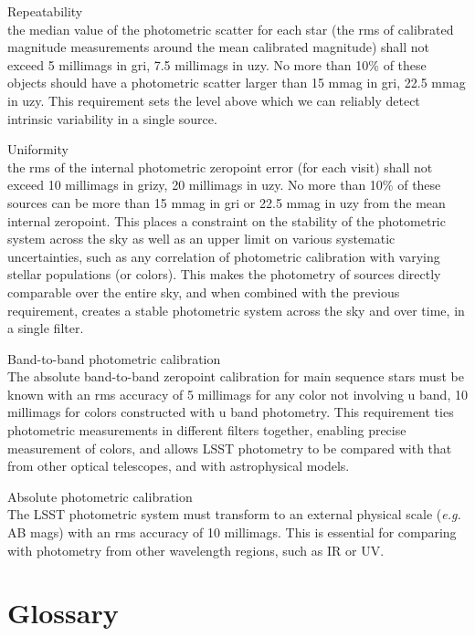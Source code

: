 \documentclass[12pt]{article}
\newcommand{\eg}{\textit{e.g.}\xspace}
\begin{document}
\begin{description}
\item{Repeatability}\\
  the median value of the photometric scatter for each star (the rms of calibrated
  magnitude measurements around the mean calibrated magnitude) shall not exceed 5 millimags in gri, 7.5
  millimags in uzy. No more than 10\% of these objects should have a photometric scatter larger than 15 mmag
  in gri, 22.5 mmag in uzy. This requirement sets the level above which we can reliably detect intrinsic
  variability in a single source.
  
\item{Uniformity}\\
  the rms of the internal photometric zeropoint error (for each visit) shall not exceed 10
  millimags in grizy, 20 millimags in uzy. No more than 10\% of these sources can be more than 15 mmag in gri
  or 22.5 mmag in uzy from the mean internal zeropoint. This places a constraint on the stability of the
  photometric system across the sky as well as an upper limit on various systematic uncertainties, such as any
  correlation of photometric calibration with varying stellar populations (or colors). This makes the
  photometry of sources directly comparable over the entire sky, and when combined with the previous
  requirement, creates a stable photometric system across the sky and over time, in a single filter.

\item{Band-to-band photometric calibration}\\
  The absolute band-to-band zeropoint calibration for main sequence
  stars must be known with an rms accuracy of 5 millimags for any color not involving u band, 10 millimags for
  colors constructed with u band photometry. This requirement ties photometric measurements in different
  filters together, enabling precise measurement of colors, and allows LSST photometry to be compared with
  that from other optical telescopes, and with astrophysical models.

\item{Absolute photometric calibration}\\
  The LSST photometric system must transform to an external physical
  scale (\eg AB mags) with an rms accuracy of 10 millimags. This is essential for comparing with photometry
  from other wavelength regions, such as IR or UV.
\end{description}

\section{Glossary}
\end{document}
